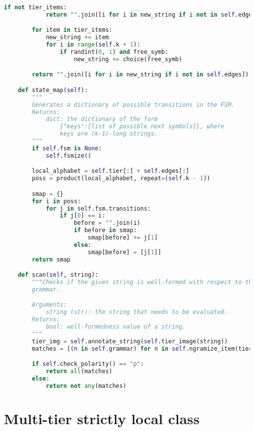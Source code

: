 \begin{lstlisting}[language=Python]
        if not tier_items:
            return "".join([i for i in new_string if i not in self.edges])

        for item in tier_items:
            new_string += item
            for i in range(self.k + 1):
                if randint(0, 1) and free_symb:
                    new_string += choice(free_symb)

        return "".join([i for i in new_string if i not in self.edges])

    def state_map(self):
        """
        Generates a dictionary of possible transitions in the FSM.
        Returns:
            dict: the dictionary of the form
                {"keys":[list of possible next symbols]}, where 
                keys are (k-1)-long strings.
        """
        if self.fsm is None:
            self.fsmize()

        local_alphabet = self.tier[:] + self.edges[:]
        poss = product(local_alphabet, repeat=(self.k - 1))

        smap = {}
        for i in poss:
            for j in self.fsm.transitions:
                if j[0] == i:
                    before = "".join(i)
                    if before in smap:
                        smap[before] += j[1]
                    else:
                        smap[before] = [j[1]]
        return smap

    def scan(self, string):
        """Checks if the given string is well-formed with respect to the given
        grammar.

        Arguments:
            string (str): the string that needs to be evaluated.
        Returns:
            bool: well-formedness value of a string.
        """
        tier_img = self.annotate_string(self.tier_image(string))
        matches = [(n in self.grammar) for n in self.ngramize_item(tier_img)]

        if self.check_polarity() == "p":
            return all(matches)
        else:
            return not any(matches)
\end{lstlisting}

\section{Multi-tier strictly local class}

